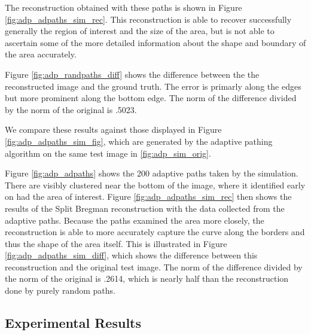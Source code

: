 \documentclass[english]{article}\usepackage[]{graphicx}\usepackage[]{color}
\begin{document}
The reconstruction obtained with these paths is shown in Figure \ref{fig:adp_adpaths_sim_rec}. This reconstruction is able to recover successfully generally the region of interest and the size of the area, but is not able to ascertain some of the more detailed information about the shape and boundary of the area accurately. 

Figure \ref{fig:adp_randpaths_diff} shows the difference between the the reconstructed image and the ground truth. The error is primarly along the edges but more prominent along the bottom edge. The norm of the difference divided by the norm of the original is .5023.

We compare these results against those displayed in Figure \ref{fig:adp_adpaths_sim_fig}, which are generated by the adaptive pathing algorithm on the same test image in \ref{fig:adp_sim_orig}. 

Figure \ref{fig:adp_adpaths} shows the 200 adaptive paths taken by the simulation. There are visibly clustered near the bottom of the image, where it identified early on had the area of interest. Figure \ref{fig:adp_adpaths_sim_rec} then shows the results of the Split Bregman reconstruction with the data collected from the adaptive paths. Because the paths examined the area more closely, the reconstruction is able to more accurately capture the curve along the borders and thus the shape of the area itself. This is illustrated in Figure \ref{fig:adp_adpaths_sim_diff}, which shows the difference between this reconstruction and the original test image. The norm of the difference divided by the norm of the original is .2614, which is nearly half than the reconstruction done by purely random paths.

\subsection{Experimental Results}
\end{document}
